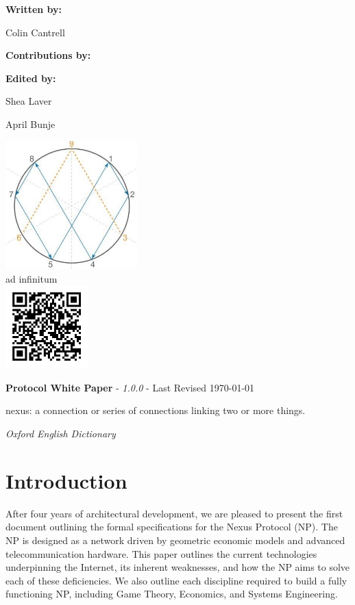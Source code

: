 \documentclass[11pt]{article}
\newcommand{\maketitlepage}[3]{
  \begingroup
  \centering
   
  \vspace*{2\baselineskip}
  
  \textbf{Written by:}\par
  \medskip
  Colin Cantrell\par

  \vspace*{2\baselineskip}

  \textbf{Contributions by:}\par\medskip
  \renewcommand\do[1]{%
    {
    \usevalue ##1:firstname \space \usevalue ##1:lastname \par}%
    }
  \docsvlist{#1}
  
  \vspace*{1.5\baselineskip}
  
  \textbf{Edited by:}\par
  Shea Laver \par
  April Bunje
  
  
  \vspace*{2\baselineskip}
  \includegraphics[width=0.38\textwidth]{./images/rsz_logo.png} \\
  \medskip
  ad infinitum \\
  
  \vspace*{1\baselineskip}
  \includegraphics[width=0.24\textwidth]{./images/rsz_npqr.png} \\
  \vspace*{3\baselineskip}
 

\pagebreak
\endgroup
}
\begin{document}
\title{\rmfamily{}}

\date {\usvardate {}}
\maketitle
\begin{abstract}
\bigskip


\noindent The Internet is one of the most important modern-day technologies, based on the Open Systems Interconnection (OSI) model with which there remains unresolved architectural limitations despite continued improvements.
Within this document, we outline a new architecture for the Internet that combines micro-satellites, phased array antennas, and software-defined routing to achieve a new degree of security and accessibility otherwise unobtainable under the OSI model used today.
These components are woven together throughout a global ecosystem that provides incentive for the growth of the network using economic models and game theory. 
Together they can replace the need for centralized Internet Service Providers (ISPs), limit censorship of free information, and give access to new services for users around the world.

\end{abstract}

\newpage

\tableofcontents
\newpage

\maketitlepage{Victor, BA}
\newpage


\paragraph{\textbf{Protocol White Paper} - \textit{1.0.0} - Last Revised \today }

\epigraph{nexus: a connection or series of connections linking two or more things.}{\textit{\footnotesize{Oxford English Dictionary}}}


\section{Introduction}

After four years of architectural development, we are pleased to present the first document outlining the formal specifications for the Nexus Protocol (NP).
The NP is designed as a network driven by geometric economic models and advanced telecommunication hardware.
This paper outlines the current technologies underpinning the Internet, its inherent weaknesses, and how the NP aims to solve each of these deficiencies.
We also outline each discipline required to build a fully functioning NP, including Game Theory, Economics, and Systems Engineering.
\end{document}
